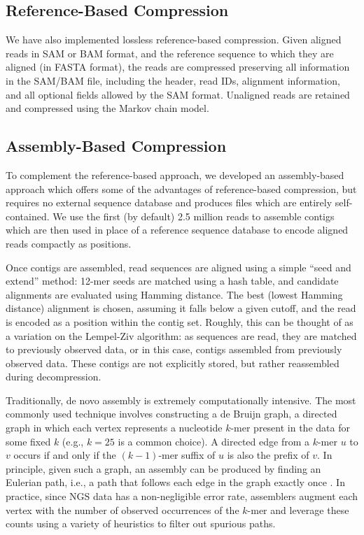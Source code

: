 \documentclass[a4,center,fleqn]{NAR}
\begin{document}
\subsection{Reference-Based Compression}

We have also implemented lossless reference-based compression. Given aligned
reads in SAM or BAM format, and the reference sequence to which they are
aligned (in FASTA format), the reads are compressed preserving all information
in the SAM/BAM file, including the header, read IDs, alignment information,
and all optional fields allowed by the SAM format. Unaligned reads are
retained and compressed using the Markov chain model.


\subsection{Assembly-Based Compression}

To complement the reference-based approach, we developed an assembly-based
approach which offers some of the advantages of reference-based compression,
but requires no external sequence database and produces files which are
entirely self-contained. We use the first (by default) 2.5 million reads to
assemble contigs which are then used in place of a reference sequence
database to encode aligned reads compactly as positions.

Once contigs are assembled, read sequences are aligned using a simple ``seed
and extend'' method: 12-mer seeds are matched using a hash table, and
candidate alignments are evaluated using Hamming distance. The best
(lowest Hamming distance) alignment is chosen, assuming it falls below a given
cutoff, and the read is encoded as a position within the contig set. Roughly,
this can be thought of as a variation on the Lempel-Ziv algorithm: as
sequences are read, they are matched to previously observed data, or in this
case, contigs assembled from previously observed data. These contigs are
not explicitly stored, but rather reassembled during decompression.



Traditionally, de novo assembly is extremely computationally intensive. The
most commonly used technique involves constructing a de Bruijn graph, a
directed graph in which each vertex represents a nucleotide $k$-mer present in
the data for some fixed $k$ (e.g., $k = 25$ is a common choice). A directed
edge from a $k$-mer $u$ to $v$ occurs if and only if the $(k - 1)$-mer suffix
of $u$ is also the prefix of $v$. In principle, given such a graph, an
assembly can be produced by finding an Eulerian path, i.e., a path that
follows each edge in the graph exactly once \citep{Pevzner2001}. In practice,
since NGS data has a non-negligible error rate, assemblers augment each vertex
with the number of observed occurrences of the $k$-mer and leverage these
counts using a variety of heuristics to filter out spurious paths.
\end{document}
